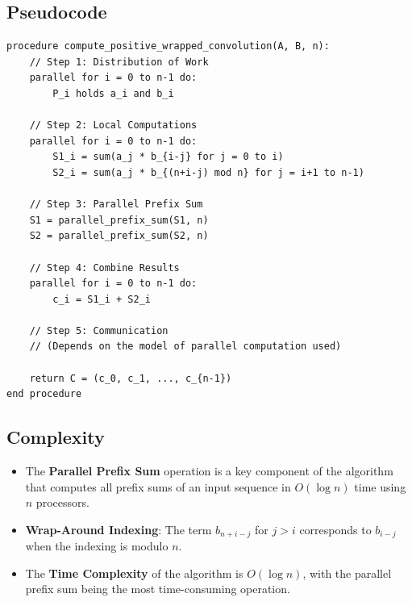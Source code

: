\documentclass{article}
\begin{document}
\subsection*{Pseudocode}
\begin{verbatim}
procedure compute_positive_wrapped_convolution(A, B, n):
    // Step 1: Distribution of Work
    parallel for i = 0 to n-1 do:
        P_i holds a_i and b_i

    // Step 2: Local Computations
    parallel for i = 0 to n-1 do:
        S1_i = sum(a_j * b_{i-j} for j = 0 to i)
        S2_i = sum(a_j * b_{(n+i-j) mod n} for j = i+1 to n-1)

    // Step 3: Parallel Prefix Sum
    S1 = parallel_prefix_sum(S1, n)
    S2 = parallel_prefix_sum(S2, n)

    // Step 4: Combine Results
    parallel for i = 0 to n-1 do:
        c_i = S1_i + S2_i

    // Step 5: Communication
    // (Depends on the model of parallel computation used)

    return C = (c_0, c_1, ..., c_{n-1})
end procedure
\end{verbatim}

\subsection*{Complexity}
\begin{itemize}
    \item The \textbf{Parallel Prefix Sum} operation is a key component of the algorithm that computes all prefix sums of an input sequence in \( O(\log n) \) time using \( n \) processors.
    \item \textbf{Wrap-Around Indexing}: The term \( b_{n+i-j} \) for \( j > i \) corresponds to \( b_{i-j} \) when the indexing is modulo \( n \).
    \item The \textbf{Time Complexity} of the algorithm is \( O(\log n) \), with the parallel prefix sum being the most time-consuming operation.
\end{itemize}
\end{document}
